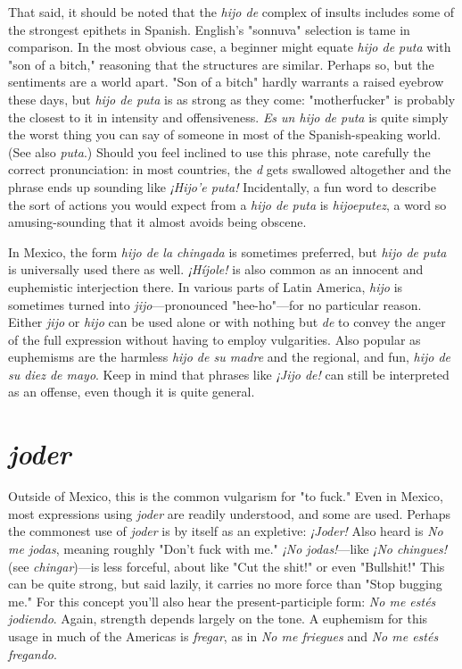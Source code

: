 That said, it should be noted that the \emph{hijo de} complex of insults includes some of the strongest epithets in Spanish. English's
"sonnuva" selection is tame in comparison. In the most obvious case,
a beginner might equate \emph{hijo de puta} with "son of a bitch," reasoning
that the structures are similar. Perhaps so, but the sentiments are a
world apart. "Son of a bitch" hardly warrants a raised eyebrow these
days, but \emph{hijo de puta} is as strong as they come: "motherfucker" is
probably the closest to it in intensity and offensiveness. \emph{Es un hijo de
puta} is quite simply the worst thing you can say of someone in most of
the Spanish-speaking world. (See also \emph{puta}.) Should you feel inclined
to use this phrase, note carefully the correct pronunciation: in most
countries, the \emph{d} gets swallowed altogether and the phrase ends up sounding like \emph{¡Hijo'e puta!} Incidentally, a fun word to describe the sort of
actions you would expect from a \emph{hijo de puta} is \emph{hijoeputez}, a word so
amusing-sounding that it almost avoids being obscene.

In Mexico, the form \emph{hijo de la chingada} is sometimes preferred, but \emph{hijo de puta} is universally used there as well. \emph{¡Híjole!} is
also common as an innocent and euphemistic interjection there. In
various parts of Latin America, \emph{hijo} is sometimes turned into \emph{jijo}---pronounced "hee-ho"---for no particular reason. Either \emph{jijo} or \emph{hijo} can
be used alone or with nothing but \emph{de} to convey the anger of the full
expression without having to employ vulgarities. Also popular as euphemisms are the harmless \emph{hijo de su madre} and the regional, and fun,
\emph{hijo de su diez de mayo}. Keep in mind that phrases like \emph{¡Jijo de!} can
still be interpreted as an offense, even though it is quite general.

\section{\emph{joder}}

Outside of Mexico, this is the common vulgarism for "to
fuck." Even in Mexico, most expressions using \emph{joder} are readily understood, and some are used. Perhaps the commonest use of \emph{joder} is by
itself as an expletive: \emph{¡Joder!} Also heard is \emph{No me jodas}, meaning
roughly "Don't fuck with me." \emph{¡No jodas!}---like \emph{¡No chingues!} (see
\emph{chingar})---is less forceful, about like "Cut the shit!" or even "Bullshit!" This can be quite strong, but said lazily, it carries no more force
than "Stop bugging me." For this concept you'll also hear the present-participle form: \emph{No me estés jodiendo}. Again, strength depends largely
on the tone. A euphemism for this usage in much of the Americas is
\emph{fregar}, as in \emph{No me friegues} and \emph{No me estés fregando}.

